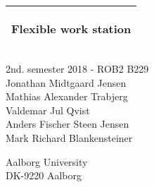 %
%
%
%
%
\begin{titlepage}
  \addtolength{\hoffset}{0.5\evensidemargin-0.5\oddsidemargin} %
  \noindent%
  \begin{tabular}{@{}p{\textwidth}@{}}
    \toprule[2pt]
    \midrule
    \vspace{0.2cm}
    \begin{center}
    \Huge{\textbf{
      Flexible work station
    }}
    \end{center}
    \vspace{0.2cm}\\
    \midrule
    \toprule[2pt]
  \end{tabular}
  \vspace{4 cm}
  \begin{center}
    {\large
      2nd. semester 2018 - ROB2 B229%
    }\\
    \vspace{0.2cm}
    {\Large
      Jonathan Midtgaard Jensen\\
      Mathias Alexander Trabjerg\\
      Valdemar Jul Qvist\\ 
      Anders Fischer Steen Jensen\\
      Mark Richard Blankensteiner\\
    }
  \end{center}
  \vfill
  \begin{center}
  Aalborg University\\
  DK-9220 Aalborg
  \end{center}
\end{titlepage}
\clearpage
